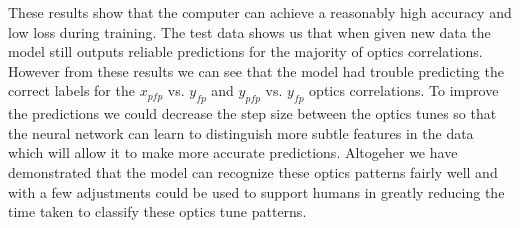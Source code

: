 \documentclass[conference]{IEEEtran}
\begin{document}
These results show that the computer can achieve a reasonably high accuracy and low loss during training. The test data shows us that when given new data the model still outputs reliable predictions for the majority of optics correlations. However from these results we can see that the model had trouble predicting the correct labels for the $x_{pfp}$ vs. $y_{fp}$ and  $y_{pfp}$ vs. $y_{fp}$  optics correlations. To improve the predictions we could decrease the step size between the optics tunes so that the neural network can learn to distinguish more subtle features in the data which will allow it to make more accurate predictions. Altogeher we have demonstrated that the model can recognize these optics patterns fairly well and with a few adjustments could be used to support humans in greatly reducing the time taken to classify these optics tune patterns.









   

\end{document}
